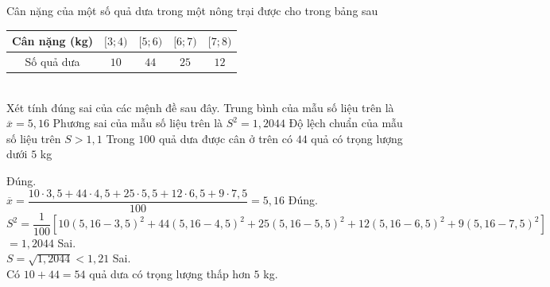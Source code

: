 \begin{ex}%
	Cân nặng của một số quả dưa trong một nông trại được cho trong bảng sau\\
	\begin{tabular}{|c|c|c|c|c|}
		\hline
		Cân nặng (kg) & $[3;4)$  & $[5;6)$  & $[6;7)$  & $[7;8)$ \\
		\hline
		Số quả dưa & $10$  & $44$ & $25$ & $12$  \\
		\hline
	\end{tabular}\\
	Xét tính đúng sai của các mệnh đề sau đây.
	\choiceTF
	{\True Trung bình của mẫu số liệu trên là  $\overline x  = 5{,}16$	}
	{\True Phương sai của mẫu số liệu trên là $S^2 = 1{,}2044$	}
	{ Độ lệch chuẩn của mẫu số liệu trên $S > 1{,}1$	}
	{ Trong $100$ quả dưa được cân ở trên có $44$ quả có trọng lượng dưới $5$ kg	}
	\loigiai
	{
		\begin{itemchoice}
			\itemch Đúng. \\
			$\overline x  = \dfrac{10\cdot 3{,}5 + 44\cdot 4{,}5 + 25\cdot 5{,}5 + 12\cdot 6{,}5 + 9\cdot 7{,}5}{100} = 5{,}16$
			\itemch Đúng. \\
			${S^2} = \dfrac{1}{100}\left[ {10{(5{,}16 - 3{,}5)}^2 + 44{(5{,}16 - 4{,}5)}^2 + 25{(5{,}16 - 5{,}5)}^2 + 12{(5{,}16 - 6{,}5)}^2 + 9{(5{,}16 - 7{,}5)}^2} \right]$ \\
			$ = 1{,}2044$
			\itemch Sai. \\
			$S = \sqrt {1{,}2044}  < 1{,}21$
			\itemch Sai.\\
			Có $10 + 44 = 54$ quả dưa có trọng lượng thấp hơn $5$ kg.
			
		\end{itemchoice}
	}
\end{ex}


